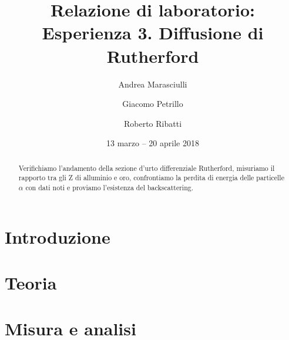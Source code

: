 \documentclass[a4paper]{article}
\title{Relazione di laboratorio:\\
Esperienza 3. Diffusione di Rutherford}
\author{Andrea Marasciulli
\and Giacomo Petrillo
\and Roberto Ribatti}
\date{13 marzo -- 20 aprile 2018}
\begin{document}
\maketitle

\begin{abstract}
	Verifichiamo l'andamento della sezione d'urto differenziale Rutherford,
	misuriamo il rapporto tra gli Z di alluminio e oro,
	confrontiamo la perdita di energia delle particelle $\alpha$ con dati noti
	e proviamo l'esistenza del backscattering.
\end{abstract}

{\tableofcontents}

\newpage
\section{Introduzione}





\section{Teoria}



\section{Misura e analisi}

















\appendix



\end{document}
